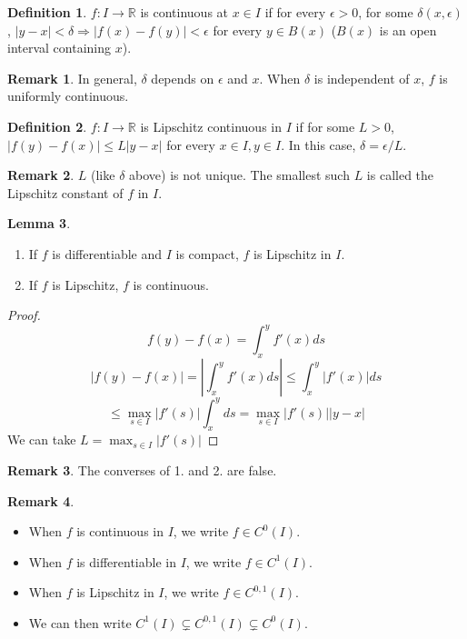 \documentclass[12pt,a4paper]{article}
\theoremstyle{definition}
\newtheorem{definition}{Definition}[subsection]
\newtheorem{lemma}[definition]{Lemma}
\newtheorem*{remark}{Remark}
\begin{document}
\begin{definition}
	$f: I \rightarrow \mathbb{R}$ is continuous at $x \in I$ if for every $\epsilon > 0$, for some $\delta(x, \epsilon)$, $|y - x| < \delta \Rightarrow |f(x) - f(y)| < \epsilon$ for every $y \in B(x)$ ($B(x)$ is an open interval containing $x$).
\end{definition}

\begin{remark}
	In general, $\delta$ depends on $\epsilon$ and $x$. When $\delta$ is independent of $x$, $f$ is uniformly continuous.
\end{remark}

\begin{definition}
	$f: I \rightarrow \mathbb{R}$ is Lipschitz continuous in $I$ if for some $L > 0$, $|f(y) - f(x)| \le L|y - x|$ for every $x \in I, y \in I$. In this case, $\delta = \epsilon / L$.
\end{definition}

\begin{remark}
	$L$ (like $\delta$ above) is not unique. The smallest such $L$ is called the Lipschitz constant of $f$ in $I$.
\end{remark}

\begin{lemma}
	\hfill
	\begin{enumerate}
		\item If $f$ is differentiable and $I$ is compact, $f$ is Lipschitz in $I$.
		\item If $f$ is Lipschitz, $f$ is continuous.
	\end{enumerate}
\end{lemma}

\begin{proof}
	\[f(y) - f(x) = \int_x^y f'(x) ds\]
	\[|f(y) - f(x)| = |\int_x^y f'(x) ds| \le \int_x^y |f'(x)| ds\]
	\[\le \max_{s \in I} |f'(s)| \int_x^y ds = \max_{s \in I} |f'(s)| |y - x|\]
	We can take $L = \max_{s \in I} |f'(s)|$
\end{proof}

\begin{remark}
	The converses of 1. and 2. are false.
\end{remark}

\begin{remark}
	\begin{itemize}
		\item When $f$ is continuous in $I$, we write $f \in C^0 (I)$.
		\item When $f$ is differentiable in $I$, we write $f \in C^1 (I)$.
		\item When $f$ is Lipschitz in $I$, we write $f \in C^{0, 1} (I)$.
		\item We can then write $C^1 (I) \subsetneq C^{0, 1} (I) \subsetneq C^0 (I)$.
	\end{itemize}
\end{remark}
\end{document}
